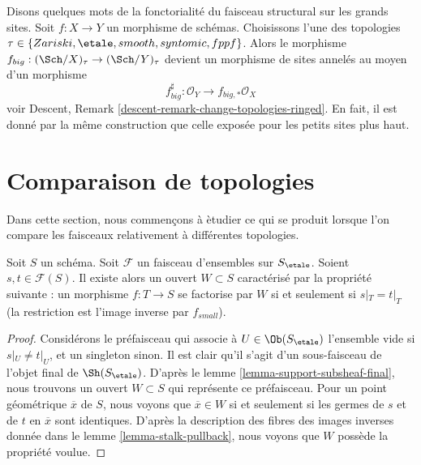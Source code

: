 \medskip\noindent
Disons quelques mots de la fonctorialit\'e du faisceau structural sur les grands sites.
Soit $f : X \to Y$ un morphisme de sch\'emas. Choisissons l'une des
topologies $\tau \in \{Zariski,\linebreak[0]
\etale,\linebreak[0] smooth,\linebreak[0] syntomic,\linebreak[0]
fppf\}$. Alors le morphisme
$f_{big} : (\Sch/X)_\tau \to (\Sch/Y)_\tau$
devient un morphisme de sites annel\'es au moyen d'un morphisme
$$
f_{big}^\sharp : \mathcal{O}_Y \longrightarrow f_{big, *}\mathcal{O}_X
$$
voir Descent, Remark \ref{descent-remark-change-topologies-ringed}.
En fait, il est donn\'e par la m\^eme construction que celle expos\'ee pour les petits
sites plus haut.












\section{Comparaison de topologies}
\label{section-compare-topologies}

\noindent
Dans cette section, nous commen\c{c}ons \`a \`etudier ce qui se produit lorsque l'on compare
les faisceaux relativement \`a diff\'erentes topologies.

\begin{lemma}
\label{lemma-where-sections-are-equal}
Soit $S$ un sch\'ema. Soit $\mathcal{F}$ un faisceau d'ensembles sur $S_\etale$.
Soient $s, t \in \mathcal{F}(S)$. Il existe alors un ouvert $W \subset S$
caract\'eris\'e par la propri\'et\'e suivante : un morphisme $f : T \to S$
se factorise par $W$ si et seulement si $s|_T = t|_T$ (la restriction est
l'image inverse par $f_{small}$).
\end{lemma}

\begin{proof}
Consid\'erons le pr\'efaisceau qui associe \`a $U \in \Ob(S_\etale)$ l'ensemble vide
si $s|_U \not = t|_U$, et un singleton sinon. Il est clair qu'il s'agit
d'un sous-faisceau de l'objet final de $\Sh(S_\etale)$. D'apr\`es le
lemme \ref{lemma-support-subsheaf-final},
nous trouvons un ouvert $W \subset S$ qui repr\'esente ce pr\'efaisceau.
Pour un point g\'eom\'etrique $\overline{x}$ de $S$, nous voyons que $\overline{x} \in W$
si et seulement si les germes de $s$ et de $t$ en $\overline{x}$ sont identiques.
D'apr\`es la description des fibres des images inverses donn\'ee dans le
lemme \ref{lemma-stalk-pullback},
nous voyons que $W$ poss\`ede la propri\'et\'e voulue.
\end{proof}


